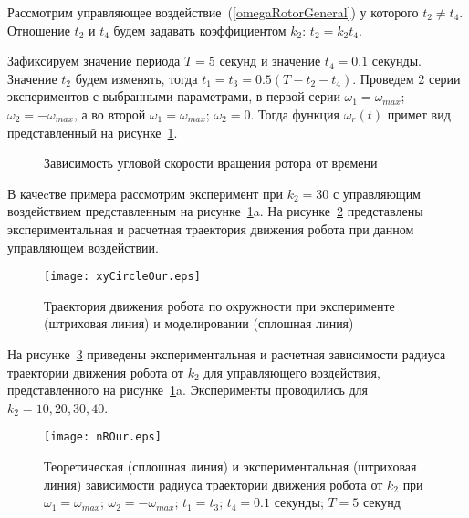 Рассмотрим управляющее воздействие~(\ref{omegaRotorGeneral}) у которого $ t_2 \neq t_4 $. Отношение $ t_2 $ и $t_4 $ будем задавать коэффициентом $ k_2 $: $ t_2 = k_2t_4 $.

Зафиксируем значение периода $ T=5 $ секунд и значение $ t_4 = 0.1 $ секунды. Значение $ t_2 $ будем изменять, тогда $ t_1 = t_3 = 0.5(T - t_2 - t_4) $. Проведем 2 серии экспериментов с выбранными параметрами, в первой серии $ \omega_1 = \omega_{max} $; $ \omega_2 = -\omega_{max} $, а во второй $ \omega_1 = \omega_{max} $; $ \omega_2 = 0 $. Тогда функция $ \omega_r(t) $ примет вид представленный на рисунке~\ref{ControlActionOur}.

\begin{figure}[!ht]
	\begin{minipage}[h]{0.5\linewidth}
	\end{minipage}
	\hfill
	\begin{minipage}[h]{0.5\linewidth}
	\end{minipage}
	\caption{Зависимость угловой скорости вращения ротора от времени}
	\label{ControlActionOur}
\end{figure}

В качеcтве примера рассмотрим эксперимент при $ k_2=30 $ с управляющим воздействием представленным на рисунке~\ref{ControlActionOur}a. На рисунке~\ref{xyCircle2} представлены экспериментальная и расчетная траектория движения робота при данном управляющем воздействии.

\begin{figure}[!h]
	\centering
	\texttt{[image: xyCircleOur.eps]}
	\caption{Траектория движения робота по окружности при эксперименте (штриховая линия) и моделировании (сплошная линия)}
	\label{xyCircle2}
\end{figure}

На рисунке~\ref{nROur} приведены экспериментальная и расчетная зависимости радиуса траектории движения робота от $k_2$ для управляющего воздействия, представленного на рисунке~\ref{ControlActionOur}a. Эксперименты проводились для $ k_2=10,20,30,40 $.

\begin{figure}[!ht]
	\centering
	\texttt{[image: nROur.eps]}
	\caption{Теоретическая (сплошная линия) и экспериментальная (штриховая линия) зависимости радиуса траектории движения робота от $k_2$ при $\omega_1 = \omega_{max} $; $ \omega_2 = -\omega_{max} $; $ t_1=t_3 $; $ t_4=0.1 $ секунды; $ T = 5 $ секунд}
	\label{nROur}
\end{figure}

